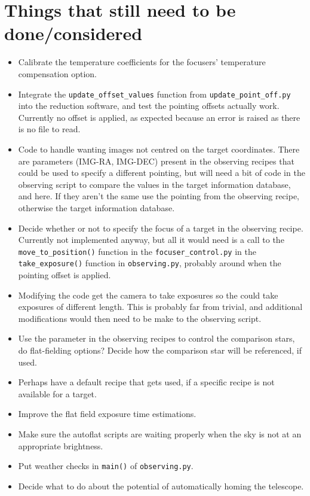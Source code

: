 \documentclass[a4paper,12pt]{article}
\newcommand{\observing}{\tt{observing.py}}
\begin{document}
{\section{Things that still need to be done/considered}

\begin{itemize}
\item{Calibrate the temperature coefficients for the focusers' temperature compensation option.}
\item{Integrate the {\tt update\_offset\_values} function from {\tt update\_point\_off.py} into the reduction software, and test the pointing offsets actually work. Currently no offset is applied, as expected because an error is raised as there is no file to read.}
\item{Code to handle wanting images not centred on the target coordinates. There are parameters (IMG-RA, IMG-DEC) present in the observing recipes that could be used to specify a different pointing, but will need a bit of code in the observing script to compare the values in the target information database, and here. If they aren't the same use the pointing from the observing recipe, otherwise the target information database.}
\item{Decide whether or not to specify the focus of a target in the observing recipe. Currently not implemented anyway, but all it would need is a call to the {\tt move\_to\_position()} function in the {\tt focuser\_control.py} in the {\tt take\_exposure()} function in {\observing}, probably around when the pointing offset is applied.}
\item{Modifying the code get the camera to take exposures so the could take exposures of different length. This is probably far from trivial, and additional modifications would then need to be make to the observing script.}
\item{Use the parameter in the observing recipes to control the comparison stars, do flat-fielding options? Decide how the comparison star will be referenced, if used.}
\item{Perhaps have a default recipe that gets used, if a specific recipe is not available for a target.}
\item{Improve the flat field exposure time estimations.}
\item{Make sure the autoflat scripts are waiting properly when the sky is not at an appropriate brightness.}
\item{Put weather checks in {\tt main()} of {\observing}.}
\item{Decide what to do about the potential of automatically homing the telescope.}

\end{itemize}}
\end{document}
